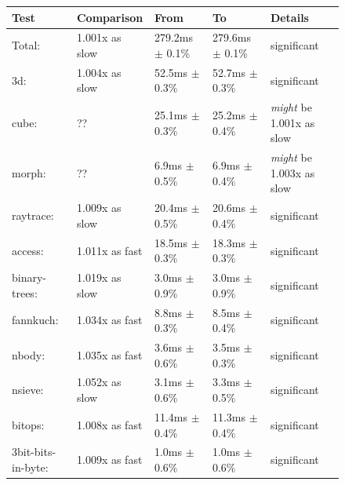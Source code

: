 \documentclass{article}
\begin{document}
\begin{figure}[H]
\begin{center}
\begin{tabular}{|l|l|l|l|l|}
\hline
    \textbf{Test}                   & \textbf{Comparison}       &     \textbf{From}         &        \textbf{To}           &  \textbf{Details} \\
\hline\hline
Total:                 & 1.001x as slow & 279.2ms $\pm$ 0.1\% &  279.6ms $\pm$ 0.1\%   &  significant \\
\hline\hline
3d:                  & 1.004x as slow &  52.5ms $\pm$ 0.3\% &   52.7ms $\pm$ 0.3\%   &  significant \\
\hline\hspace{0.5em} cube:              & ??               &  25.1ms $\pm$ 0.3\% &   25.2ms $\pm$ 0.4\%   &  \textit{might} be 1.001x as slow \\
\hline\hspace{0.5em} morph:             & ??               &   6.9ms $\pm$ 0.5\% &    6.9ms $\pm$ 0.4\%   &  \textit{might} be 1.003x as slow \\
\hline\hspace{0.5em} raytrace:          & 1.009x as slow &  20.4ms $\pm$ 0.5\% &   20.6ms $\pm$ 0.4\%   &  significant \\
\hline\hline
access:              & 1.011x as fast   &  18.5ms $\pm$ 0.3\% &   18.3ms $\pm$ 0.3\%   &  significant \\
\hline\hspace{0.5em} binary-trees:      & 1.019x as slow &   3.0ms $\pm$ 0.9\% &    3.0ms $\pm$ 0.9\%   &  significant \\
\hline\hspace{0.5em} fannkuch:          & 1.034x as fast   &   8.8ms $\pm$ 0.3\% &    8.5ms $\pm$ 0.4\%   &  significant \\
\hline\hspace{0.5em} nbody:             & 1.035x as fast   &   3.6ms $\pm$ 0.6\% &    3.5ms $\pm$ 0.3\%   &  significant \\
\hline\hspace{0.5em} nsieve:            & 1.052x as slow &   3.1ms $\pm$ 0.6\% &    3.3ms $\pm$ 0.5\%   &  significant \\
\hline\hline
bitops:              & 1.008x as fast   &  11.4ms $\pm$ 0.4\% &   11.3ms $\pm$ 0.4\%   &  significant \\
\hline\hspace{0.5em} 3bit-bits-in-byte: & 1.009x as fast   &   1.0ms $\pm$ 0.6\% &    1.0ms $\pm$ 0.6\%   &  significant \\

\end{tabular}
\end{center}
\end{figure}
\end{document}

